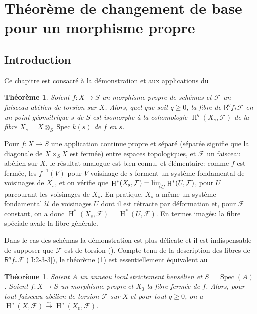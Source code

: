 \documentclass{book}
\DeclareMathOperator{\h}{H}
\DeclareMathOperator{\spec}{Spec}
\newcommand{\cF}{\mathcal{F}}
\newcommand{\sU}{\mathscr{U}}
\newcommand{\iso}{\xrightarrow\sim}
\newcommand{\R}{\mathsf{R}}
\newtheorem{theorem}[subsubsection]{Théorème}
\begin{document}
\section{Théorème de changement de base pour un morphisme propre}\label{I:4}










\subsection{Introduction}\label{I:4-1}

Ce chapitre est consacré à la démonstration et aux applications du 





\begin{theorem}\label{I:4-1-1}
Soient $f:X\to S$ un morphisme propre de schémas et $\cF$ un faisceau abélien 
de torsion sur $X$. Alors, quel que soit $q\geqslant 0$, la fibre de 
$\R^q f_* \cF$ en un point géométrique $s$ de $S$ est isomorphe à la 
cohomologie $\h^q(X_s,\cF)$ de la fibre $X_s=X\otimes_S \spec k(s)$ de $f$ en 
$s$. 
\end{theorem}

Pour $f:X\to S$ une application continue propre et séparé (séparée 
signifie que la diagonale de $X\times_S X$ est fermée) entre espaces 
topologiques, et $\cF$ un faisceau abélien sur $X$, le résultat analogue est 
bien connu, et élémentaire: comme $f$ est fermée, les $f^{-1}(V)$ pour 
$V$ voisinage de $s$ forment un système fondamental de voisinages de $X_s$, et 
on vérifie que $\h^*(X_s,\cF) = \varinjlim_U \h^*(U,\cF)$, pour $U$ parcourant les 
voisinages de $X_s$. En pratique, $X_s$ a même un système fondamental 
$\sU$ de voisinages $U$ dont il est rétracte par déformation et, pour $\cF$ 
constant, on a donc $\h^*(X_s,\cF)=\h^*(U,\cF)$. En termes imagés: la fibre 
spéciale avale la fibre générale. 

Dans le cas des schémas la démonstration est plus délicate et il est 
indispensable de supposer que $\cF$ est de torsion (\cite[XII.2]{4}). Compte 
tenu de la description des fibres de $\R^q f_* \cF$ (\ref{I:2-3-3}), le théorème 
(\ref{I:4-1-1}) est essentiellement équivalent au 

 
  
   
    
\begin{theorem}\label{I:4-1-2}
Soient $A$ un anneau local strictement hensélien et $S=\spec(A)$. Soient 
$f:X\to S$ un morphisme propre et $X_0$ la fibre fermée de $f$. Alors, pour 
tout faisceau abélien de torsion $\cF$ sur $X$ et pour tout $q\geqslant 0$, on 
a $\h^q(X,\cF) \iso \h^q(X_0,\cF)$. 
\end{theorem} 
\end{document}

